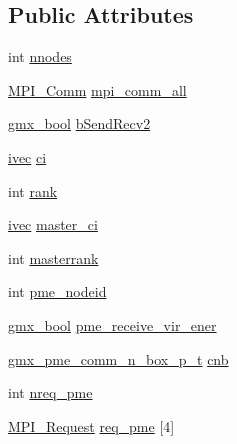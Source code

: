 \subsection*{\-Public \-Attributes}
\begin{DoxyCompactItemize}
\item 
int \hyperlink{structgmx__domdec__t_a33a279dfbe5ce9e4a69f35da71f583a6}{nnodes}
\item 
\hyperlink{include_2thread__mpi_2mpi__bindings_8h_a3880364558bd42f832e48ed33e6fafbb}{\-M\-P\-I\-\_\-\-Comm} \hyperlink{structgmx__domdec__t_a89c761036ba7d840de1d637254019187}{mpi\-\_\-comm\-\_\-all}
\item 
\hyperlink{include_2types_2simple_8h_a8fddad319f226e856400d190198d5151}{gmx\-\_\-bool} \hyperlink{structgmx__domdec__t_aa639e4d72840239af3555b6dd5503d79}{b\-Send\-Recv2}
\item 
\hyperlink{share_2template_2gromacs_2types_2simple_8h_a74f6ffdb4a9c1764f5293969d8c681b6}{ivec} \hyperlink{structgmx__domdec__t_a4ec4a0789e2e12bdf2548fb7a8a59c47}{ci}
\item 
int \hyperlink{structgmx__domdec__t_ae47259f41227fddffb027b4f64727970}{rank}
\item 
\hyperlink{share_2template_2gromacs_2types_2simple_8h_a74f6ffdb4a9c1764f5293969d8c681b6}{ivec} \hyperlink{structgmx__domdec__t_a735e31fe5a719896104c41a41bbfdf6a}{master\-\_\-ci}
\item 
int \hyperlink{structgmx__domdec__t_a71f75ff9405bdc8d5a75243dceb49a91}{masterrank}
\item 
int \hyperlink{structgmx__domdec__t_a4e82149484ccf6576b18bca5ae499e13}{pme\-\_\-nodeid}
\item 
\hyperlink{include_2types_2simple_8h_a8fddad319f226e856400d190198d5151}{gmx\-\_\-bool} \hyperlink{structgmx__domdec__t_a107ac53729161e88382b608900dbb2fc}{pme\-\_\-receive\-\_\-vir\-\_\-ener}
\item 
\hyperlink{include_2types_2commrec_8h_add104310bb238c3c5a04a32d56b10d80}{gmx\-\_\-pme\-\_\-comm\-\_\-n\-\_\-box\-\_\-p\-\_\-t} \hyperlink{structgmx__domdec__t_a82808808f2272c1647652ad3d0d16c48}{cnb}
\item 
int \hyperlink{structgmx__domdec__t_a4a8210a6f31b99569ae907659352b8ee}{nreq\-\_\-pme}
\item 
\hyperlink{include_2thread__mpi_2mpi__bindings_8h_a5e592ad8164ac5353fef0a9184a1c231}{\-M\-P\-I\-\_\-\-Request} \hyperlink{structgmx__domdec__t_a5cfe4db2868e90eb47bab14f5b25ed6f}{req\-\_\-pme} \mbox{[}4\mbox{]}
\item 

\end{DoxyCompactItemize}
